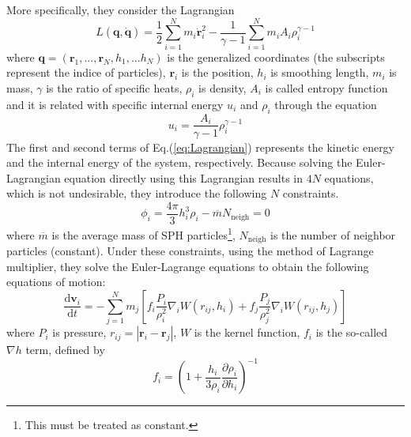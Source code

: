 More specifically, they consider the Lagrangian
\begin{equation}
L(\bm{q}, \dot{\bm{q}}) = \dfrac{1}{2}\sum^{N}_{i=1}m_{i}\dot{\bm{r}}^{2}_{i} - \dfrac{1}{\gamma -1}\sum^{N}_{i=1}m_{i}A_{i}\rho^{\gamma-1}_{i} \label{eq:Lagrangian}
\end{equation}
where $\bm{q}=(\bm{r}_{1},...,\bm{r}_{N},h_{1},...h_{N})$ is the generalized coordinates (the subscripts represent the indice of particles), $\bm{r}_{i}$ is the position, $h_{i}$ is smoothing length, $m_{i}$ is mass, $\gamma$ is the ratio of specific heats, $\rho_{i}$ is density, $A_{i}$ is called entropy function and it is related with specific internal energy $u_{i}$ and $\rho_{i}$ through the equation
\begin{equation}
u_{i} = \dfrac{A_{i}}{\gamma-1}\rho^{\gamma-1}_{i} \label{eq:relation_between_u_A_rho}
\end{equation}
The first and second terms of Eq.(\ref{eq:Lagrangian}) represents the kinetic energy and the internal energy of the system, respectively. Because solving the Euler-Lagrangian equation directly using this Lagrangian results in $4N$ equations, which is not undesirable, they introduce the following $N$ constraints.
\begin{equation}
\phi_{i} = \dfrac{4\pi}{3}h^{3}_{i}\rho_{i} - \overline{m}N_{\mathrm{neigh}}=0 \label{eq:Springel_SPH_constraints}
\end{equation}
where $\overline{m}$ is the average mass of SPH particles\footnote{This must be treated as constant.}, $N_{\mathrm{neigh}}$ is the number of neighbor particles (constant). Under these constraints, using the method of Lagrange multiplier, they solve the Euler-Lagrange equations to obtain the following equations of motion:
\begin{equation}
\dfrac{\mathrm{d}\bm{v}_{i}}{\mathrm{d}t} = - \sum^{N}_{j=1}m_{j}\left[f_{i}\dfrac{P_{i}}{\rho^{2}_{i}}\nabla_{i}W(r_{ij},h_{i})+f_{j}\dfrac{P_{j}}{\rho^{2}_{j}}\nabla_{i}W(r_{ij},h_{j})\right] \label{eq:Springel_SPH_EoM_pure_hydro}
\end{equation}
where $P_{i}$ is pressure, $r_{ij}=|\bm{r}_{i}-\bm{r}_{j}|$, $W$ is the kernel function, $f_{i}$ is the so-called $\nabla h$ term, defined by
\begin{equation}
f_{i} = \left(1 + \dfrac{h_{i}}{3\rho_{i}}\dfrac{\partial \rho_{i}}{\partial h_{i}}\right)^{-1} \label{eq:gradh_term}
\end{equation}

